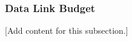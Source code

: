 
\subsubsection{Data Link Budget}
\label{subsubsec:design_3_4_data_link_budget}

[Add content for this subsection.]
